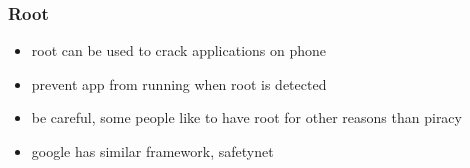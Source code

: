 \subsubsection{Root} \label{subsection:counter-improve-tampering-root}
\begin{itemize}
  \item root can be used to crack applications on phone
  \item  prevent app from running when root is detected
  \item be careful, some people like to have root for other reasons than piracy
  \item  google has similar framework, safetynet
\end{itemize}

